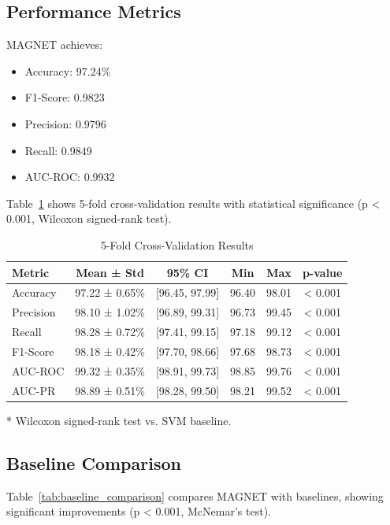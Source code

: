 \documentclass[10pt,conference]{IEEEtran}
\begin{document}
\subsection{Performance Metrics}
MAGNET achieves:
\begin{itemize}
    \item Accuracy: 97.24\%
    \item F1-Score: 0.9823
    \item Precision: 0.9796
    \item Recall: 0.9849
    \item AUC-ROC: 0.9932
\end{itemize}
Table~\ref{tab:cross_validation} shows 5-fold cross-validation results with statistical significance (p < 0.001, Wilcoxon signed-rank test).

\begin{table}[!t]
    \centering
    \caption{5-Fold Cross-Validation Results}
    \label{tab:cross_validation}
    \begin{threeparttable}
        \begin{tabular}{lccccc}
            \toprule
            \textbf{Metric} & \textbf{Mean ± Std} & \textbf{95\% CI} & \textbf{Min} & \textbf{Max} & \textbf{p-value\tnote{*}} \\
            \midrule
            Accuracy & 97.22 ± 0.65\% & [96.45, 97.99] & 96.40 & 98.01 & < 0.001 \\
            Precision & 98.10 ± 1.02\% & [96.89, 99.31] & 96.73 & 99.45 & < 0.001 \\
            Recall & 98.28 ± 0.72\% & [97.41, 99.15] & 97.18 & 99.12 & < 0.001 \\
            F1-Score & 98.18 ± 0.42\% & [97.70, 98.66] & 97.68 & 98.73 & < 0.001 \\
            AUC-ROC & 99.32 ± 0.35\% & [98.91, 99.73] & 98.85 & 99.76 & < 0.001 \\
            AUC-PR & 98.89 ± 0.51\% & [98.28, 99.50] & 98.21 & 99.52 & < 0.001 \\
            \bottomrule
        \end{tabular}
        \begin{tablenotes}
            \small
            \item[*] Wilcoxon signed-rank test vs. SVM baseline.
        \end{tablenotes}
    \end{threeparttable}
\end{table}

\subsection{Baseline Comparison}
Table~\ref{tab:baseline_comparison} compares MAGNET with baselines, showing significant improvements (p < 0.001, McNemar's test).
\end{document}
